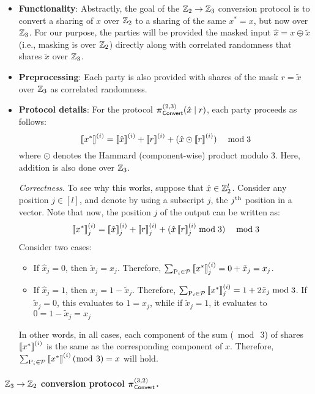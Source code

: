 \begin{itemize}
  \item \textbf{Functionality}: Abstractly, the goal of the $\mathbb{Z}_2 \to \mathbb{Z}_3$ conversion protocol is to convert a sharing of $x$ over $\mathbb{Z}_2$ to a sharing of the same $x^* = x$, but now over $\mathbb{Z}_3$. For our purpose, the parties will be provided the masked input $\hat{x} = x \oplus \tilde{x}$ (i.e., masking is over $\mathbb{Z}_2$) directly along with correlated randomness that shares $\tilde{x}$ over $\mathbb{Z}_3$.

  \item \textbf{Preprocessing}: Each party is also provided with shares of the mask $r = \tilde{x}$ over $\mathbb{Z}_3$ as correlated randomness.

  \item \textbf{Protocol details}: For the protocol $\boldsymbol{\pi}_{\textsf{Convert}}^{(2,3)}(\hat{x} \mid r)$, each party proceeds as follows:
  \[
  \left\llbracket x^* \right\rrbracket^{(i)} = \left\llbracket \hat{x} \right\rrbracket^{(i)} + \left\llbracket r \right\rrbracket^{(i)} + (\hat{x} \odot \left\llbracket r \right\rrbracket^{(i)}) \quad \bmod 3
  \]
where $\odot$ denotes the Hammard (component-wise) product modulo 3. Here, addition is also done over $\mathbb{Z}_3$.

\noindent \textit{Correctness.} To see why this works, suppose that $\hat{x} \in \mathbb{Z}_2^l$. Consider any position $j \in [l]$, and denote by using a subscript $j$, the $j^{\textnormal{th}}$ position in a vector. Note that now, the position $j$ of the output can be written as:
\[
    \left\llbracket x^* \right\rrbracket^{(i)}_j = \left\llbracket \hat{x} \right\rrbracket^{(i)}_j + \left\llbracket r \right\rrbracket^{(i)}_j + (\hat{x}\left\llbracket r \right\rrbracket^{(i)}_j\bmod 3) \quad \bmod 3
\]
Consider two cases:
\begin{itemize}
\item If $\hat{x}_j = 0$, then $\tilde{x}_j = x_j$. Therefore, $\sum_{\textnormal{P}_i \in \mathcal{P}} \left\llbracket x^* \right\rrbracket^{(i)}_j = 0 + \tilde{x}_j = x_j$.

\item If $\hat{x}_j = 1$, then $x_j = 1 - \tilde{x}_j$. Therefore, $\sum_{\textnormal{P}_i \in \mathcal{P}} \left\llbracket x^* \right\rrbracket^{(i)}_j = 1 + 2\tilde{x}_j \bmod 3$. If $\tilde{x}_j = 0$, this evaluates to $1 = x_j$, while if $\tilde{x}_j = 1$, it evaluates to $0 = 1 - \tilde{x}_j = x_j$
\end{itemize}
In other words, in all cases, each component of the sum ($\bmod~3$) of shares $\left\llbracket x^* \right\rrbracket^{(i)}$ is the same as the corresponding component of $x$. Therefore, $\sum_{\textnormal{P}_i \in \mathcal{P}} \left\llbracket x^* \right\rrbracket^{(i)} (\bmod~3) = x$ will hold.
\end{itemize}


\paragraph{$\mathbb{Z}_3 \to \mathbb{Z}_2$ conversion protocol $\boldsymbol{\pi}_{\textsf{Convert}}^{(3,2)}$.}

